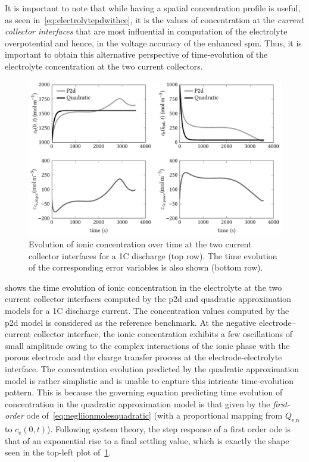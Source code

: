 It  is important  to  note that  while having  a  spatial concentration  profile
is  useful,  as  seen  in~\cref{eq:electrolytepdwithce}, it  is  the  values  of
concentration  at   the  \emph{current  collector  interfaces}   that  are  most
influential in  computation of the  electrolyte overpotential and hence,  in the
voltage accuracy of the enhanced \gls{spm}. Thus, it is important to obtain this
alternative perspective  of time-evolution  of the electrolyte  concentration at
the two current collectors.

\begin{figure}[!htb]
    \centering
    \includegraphics[width=\textwidth]{4/figures/ce_at_cc_1Cdischg.pdf}
    \caption[Ionic concentrations at current collector
    interfaces over time for 1C discharge]{Evolution of ionic concentration over
        time at the two current collector interfaces for a 1C discharge (top
        row). The time evolution of the corresponding error variables is also
    shown (bottom row).}
    \label{fig:temporalcequadratic}
\end{figure}

 shows  the time evolution of  ionic concentration
in  the electrolyte  at the  two current  collector interfaces  computed by  the
\gls{p2d} and  quadratic approximation  models for a  1C discharge  current. The
concentration  values computed  by  the  \gls{p2d} model  is  considered as  the
reference benchmark. At the negative electrode--current collector interface, the
ionic  concentration  exhibits  a  few oscillations  of  small  amplitude  owing
to  the complex  interactions  of  the ionic  phase  with  the porous  electrode
and  the charge  transfer process  at the  electrode-electrolyte interface.  The
concentration  evolution  predicted  by  the quadratic  approximation  model  is
rather  simplistic  and  is  unable to  capture  this  intricate  time-evolution
pattern.  This  is because  the  governing  equation predicting  time  evolution
of  concentration  in  the  quadratic  approximation  model  is  that  given  by
the  \emph{first-order}  \gls{ode} of~\cref{eq:negliionmolesquadratic}  (with  a
proportional mapping from $Q_\text{e,n}$ to $c_\text{e}(0,t)$). Following system
theory, the step response  of a first order \gls{ode} is  that of an exponential
rise to a final settling value, which  is exactly the shape seen in the top-left
plot of~\cref{fig:temporalcequadratic}.

